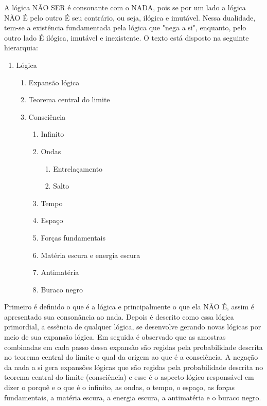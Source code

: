 A lógica NÃO SER é consonante com o NADA, pois se por um lado a lógica NÃO É pelo outro É seu contrário, ou seja, ilógica e imutável. Nessa dualidade, tem-se a existência
fundamentada pela lógica que "nega a si", enquanto, pelo outro lado É ilógica, imutável e
inexistente. O texto está disposto na seguinte hierarquia:
{\scriptsize
\begin{enumerate}[label*=\arabic*.]
   \item Lógica
   \begin{enumerate}[label*=\arabic*.]
	   \item Expansão lógica
	   \item Teorema central do limite
	   \item Consciência
		   \begin{enumerate}[label*=\arabic*.]
			   \item Infinito
			   \item Ondas 
			   \begin{enumerate}[label*=\arabic*.]
			   		\item Entrelaçamento
			   		\item Salto
			   \end{enumerate}  
			   \item Tempo
			   \item Espaço
			   \item Forças fundamentais
			   \item Matéria escura e energia escura
			   \item Antimatéria
			   \item Buraco negro
		   \end{enumerate}   
   \end{enumerate}
\end{enumerate}
}
Primeiro é definido o que é a lógica e principalmente o que ela NÃO É, assim é apresentado sua consonância ao nada. Depois é descrito como essa lógica primordial, a essência de qualquer lógica, se desenvolve gerando novas lógicas por meio de sua expansão lógica. Em seguida é observado que as amostras combinadas em cada passo dessa expansão são regidas pela probabilidade descrita no teorema central do limite o qual da origem ao que é a consciência. A negação da nada a si gera expansões lógicas que são regidas pela probabilidade descrita no teorema central do limite (consciência) e esse é o aspecto lógico responsável em dizer o porquê e o que é o infinito, as ondas, o tempo, o espaço, as forças fundamentais, a matéria escura, a energia escura, a antimatéria e o buraco negro. 